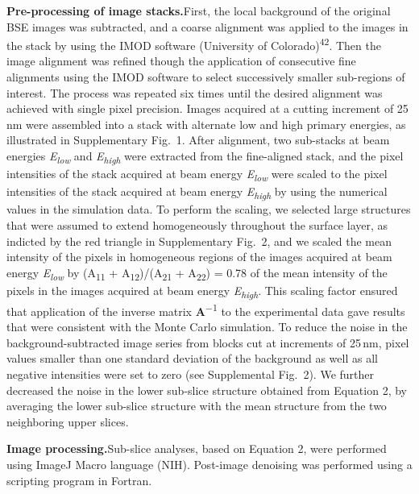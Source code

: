 \documentclass{article}
\newcommand{\cit}[1]{\textsuperscript{#1}}
\begin{document}
\medskip
\noindent\textbf{Pre-processing of image stacks.}\quad First, the local background of the original BSE images was subtracted, and a coarse alignment was applied to the images in the stack by using the IMOD software (University of Colorado)\cit{42}. Then the image alignment was refined though the application of consecutive fine alignments using the IMOD software to select successively smaller sub-regions of interest. The process was repeated six times until the desired alignment was achieved with single pixel precision. Images acquired at a cutting increment of 25\,nm were assembled into a stack with alternate low and high primary energies, as illustrated in Supplementary Fig.~1. After alignment, two sub-stacks at beam energies \emph{E}\textsubscript{\emph{low}} and \emph{E}\textsubscript{\emph{high}} were extracted from the fine-aligned stack, and the pixel intensities of the stack acquired at beam energy \emph{E}\textsubscript{\emph{low}} were scaled to the pixel intensities of the stack acquired at beam energy \emph{E}\textsubscript{\emph{high}} by using the numerical values in the simulation data. To perform the scaling, we selected large structures that were assumed to extend homogeneously throughout the surface layer, as indicted by the red triangle in Supplementary Fig.~2, and we scaled the mean intensity of the pixels in homogeneous regions of the images acquired at beam energy \emph{E}\textsubscript{\emph{low}} by (A\textsubscript{11} + A\textsubscript{12})/(A\textsubscript{21} + A\textsubscript{22}) = 0.78 of the mean intensity of the pixels in the images acquired at beam energy \emph{E}\textsubscript{\emph{high}}. This scaling factor ensured that application of the inverse matrix \textbf{A}\textsuperscript{−1} to the experimental data gave results that were consistent with the Monte Carlo simulation. To reduce the noise in the background-subtracted image series from blocks cut at increments of 25\,nm, pixel values smaller than one standard deviation of the background as well as all negative intensities were set to zero (see Supplemental Fig.~2). We further decreased the noise in the lower sub-slice structure obtained from Equation 2, by averaging the lower sub-slice structure with the mean structure from the two neighboring upper slices.

\medskip
\noindent\textbf{Image processing.}\quad Sub-slice analyses, based on Equation 2, were performed using ImageJ Macro language (NIH). Post-image denoising was performed using a scripting program in Fortran.
\end{document}

